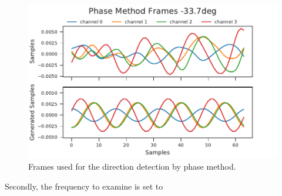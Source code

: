 \begin{figure}[ht]
	\centering
		\includegraphics[]{figures/evaluation/phase_cos}
	\caption{Frames used for the direction detection by phase method.}
	\label{fig:04_phaseSingle}
\end{figure}

Secondly, the frequency to examine is set to 